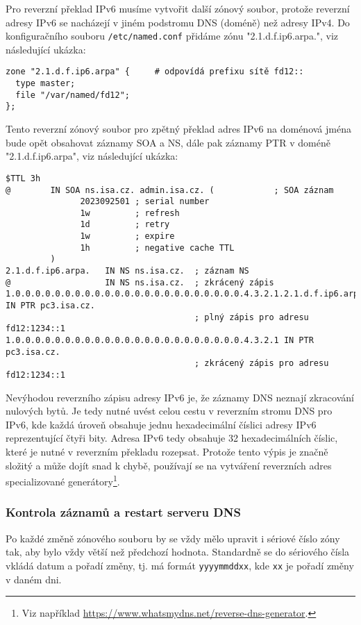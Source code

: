 Pro reverzní překlad IPv6 musíme vytvořit další zónový soubor, protože reverzní adresy IPv6 se nacházejí v jiném podstromu DNS (doméně) než adresy IPv4. Do konfiguračního souboru {\tt /etc/named.conf} přidáme zónu "2.1.d.f.ip6.arpa.", viz následující ukázka:
\begin{verbatim}
zone "2.1.d.f.ip6.arpa" {     # odpovídá prefixu sítě fd12::
  type master;
  file "/var/named/fd12";
};
\end{verbatim} 
Tento reverzní zónový soubor pro zpětný překlad adres IPv6 na doménová jména bude opět obsahovat záznamy SOA a NS, dále pak záznamy PTR v doméně  "2.1.d.f.ip6.arpa", viz následující ukázka: 
\begin{verbatim}
$TTL 3h
@        IN SOA ns.isa.cz. admin.isa.cz. (            ; SOA záznam
               2023092501 ; serial number
               1w         ; refresh
               1d         ; retry 
               1w         ; expire
               1h         ; negative cache TTL
         )
2.1.d.f.ip6.arpa.   IN NS ns.isa.cz.  ; záznam NS
@                   IN NS ns.isa.cz.  ; zkrácený zápis
1.0.0.0.0.0.0.0.0.0.0.0.0.0.0.0.0.0.0.0.0.0.0.0.4.3.2.1.2.1.d.f.ip6.arpa. IN PTR pc3.isa.cz.
                                      ; plný zápis pro adresu fd12:1234::1
1.0.0.0.0.0.0.0.0.0.0.0.0.0.0.0.0.0.0.0.0.0.0.0.4.3.2.1 IN PTR pc3.isa.cz.
                                      ; zkrácený zápis pro adresu fd12:1234::1
\end{verbatim}
Nevýhodou reverzního zápisu adresy IPv6 je, že záznamy DNS neznají zkracování nulových bytů. Je tedy nutné uvést celou cestu v reverzním stromu DNS pro IPv6, kde každá úroveň obsahuje jednu hexadecimální číslici adresy IPv6 reprezentující čtyři bity. Adresa IPv6 tedy obsahuje 32 hexadecimálních číslic, které je nutné v reverzním překladu rozepsat. Protože tento výpis je značně složitý a může dojít snad k chybě, používají se na vytváření reverzních adres specializované generátory\footnote{Viz například \url{https://www.whatsmydns.net/reverse-dns-generator}.}. 

\subsubsection{Kontrola záznamů a restart serveru DNS}
Po každé změně zónového souboru by se vždy mělo upravit i sériové číslo zóny tak, aby bylo vždy větší než předchozí hodnota. Standardně se do sériového čísla vkládá datum a pořadí změny, tj. má formát {\tt yyyymmddxx}, kde {\tt xx} je pořadí změny v daném dni. 

